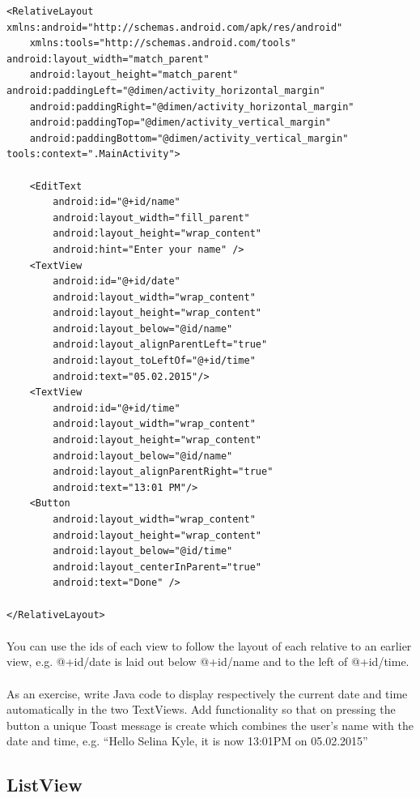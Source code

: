 \begin{lstlisting}
<RelativeLayout xmlns:android="http://schemas.android.com/apk/res/android"
    xmlns:tools="http://schemas.android.com/tools" android:layout_width="match_parent"
    android:layout_height="match_parent" android:paddingLeft="@dimen/activity_horizontal_margin"
    android:paddingRight="@dimen/activity_horizontal_margin"
    android:paddingTop="@dimen/activity_vertical_margin"
    android:paddingBottom="@dimen/activity_vertical_margin" tools:context=".MainActivity">

    <EditText
        android:id="@+id/name"
        android:layout_width="fill_parent"
        android:layout_height="wrap_content"
        android:hint="Enter your name" />
    <TextView
        android:id="@+id/date"
        android:layout_width="wrap_content"
        android:layout_height="wrap_content"
        android:layout_below="@id/name"
        android:layout_alignParentLeft="true"
        android:layout_toLeftOf="@+id/time"
        android:text="05.02.2015"/>
    <TextView
        android:id="@+id/time"
        android:layout_width="wrap_content"
        android:layout_height="wrap_content"
        android:layout_below="@id/name"
        android:layout_alignParentRight="true"
        android:text="13:01 PM"/>
    <Button
        android:layout_width="wrap_content"
        android:layout_height="wrap_content"
        android:layout_below="@id/time"
        android:layout_centerInParent="true"
        android:text="Done" />

</RelativeLayout>
\end{lstlisting}

\paragraph{} You can use the ids of each view to follow the layout of each relative to an earlier view, e.g. @+id/date is laid out below @+id/name and to the left of @+id/time.

\paragraph{} As an exercise, write Java code to display respectively the current date and time automatically in the two TextViews. Add functionality so that on pressing the button a unique Toast message is create which combines the user's name with the date and time, e.g. ``Hello Selina Kyle, it is now 13:01PM on 05.02.2015''

\subsection{ListView}
